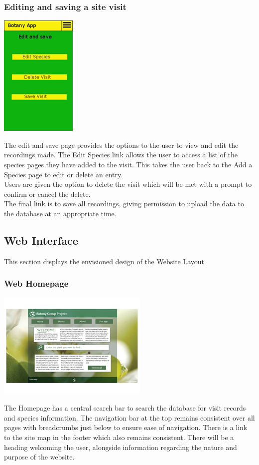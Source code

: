 	\subsubsection{Editing and saving a site visit}
		\begin{center}
			\includegraphics[scale=1]{uiDesign/botanyAppEditSaveSiteVisit.png}
		\end{center}
		The edit and save page provides the options to the user to view and edit the recordings made. The Edit Species link allows the user to access a list of the species pages they have added to the visit. This takes the user back to the Add a Species page to edit or delete an entry.\\
		
		Users are given the option to delete the visit which will be met with a prompt to confirm or cancel the delete.\\

		The final link is to save all recordings, giving permission to upload the data to the database at an appropriate time.\\
		
	\subsection{Web Interface}
		This section displays the envisioned design of the Website Layout

		\subsubsection{Web Homepage}
			\begin{center}
				\includegraphics[scale=1]{uiDesign/botanyWebHome.png}
			\end{center}
		The Homepage has a central search bar to search the database for visit records and species information. The navigation bar at the top remains consistent over all pages with breadcrumbs just below to ensure ease of navigation. There is a link to the site map in the footer which also remains consistent. There will be a heading welcoming the user, alongside information regarding the nature and purpose of the website. 

